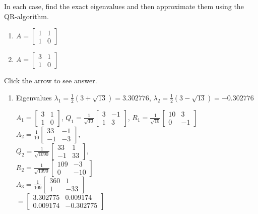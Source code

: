 \documentclass{ximera}
\begin{document}
\begin{problem}
In each case, find the exact eigenvalues and then approximate them using the QR-algorithm.


\begin{enumerate}
\item $A = \left[ \begin{array}{rr}
1 & 1 \\
1 & 0
\end{array}\right]$
\item $A = \left[ \begin{array}{rr}
3 & 1 \\
1 & 0
\end{array}\right]$
\end{enumerate}

Click the arrow to see answer.
\begin{expandable}
\begin{enumerate} 
\item  Eigenvalues $\lambda_{1} = \frac{1}{2}(3 + \sqrt{13}) = 3.302776$, $\lambda_{2} = \frac{1}{2}(3 - \sqrt{13}) = -0.302776$

$A_{1} = \left[ \begin{array}{rr}
3 & 1 \\
1 & 0
\end{array}\right]$, $Q_{1} = \frac{1}{\sqrt{10}}\left[ \begin{array}{rr}
3 & -1 \\
1 & 3
\end{array}\right]$, $R_{1} = \frac{1}{\sqrt{10}}\left[ \begin{array}{rr}
10 & 3 \\
0 & -1
\end{array}\right]$ \\
$A_{2} = \frac{1}{10}\left[ \begin{array}{rr}
33 & -1 \\
-1 & -3
\end{array}\right]$, \\ $Q_{2} = \frac{1}{\sqrt{1090}}\left[ \begin{array}{rr}
33 & 1 \\
-1 & 33
\end{array}\right]$, \\ $R_{2} = \frac{1}{\sqrt{1090}}\left[ \begin{array}{rr}
109 & -3 \\
0 & -10
\end{array}\right]$ \\
$A_{3} = \frac{1}{109}\left[ \begin{array}{rr}
360 & 1 \\
1 & -33
\end{array}\right]$ \\ ${} = \left[ \begin{array}{rr}
3.302775 & 0.009174 \\
0.009174 & -0.302775
\end{array}\right]$

\end{enumerate}
\end{expandable}
\end{problem}
\end{document}
